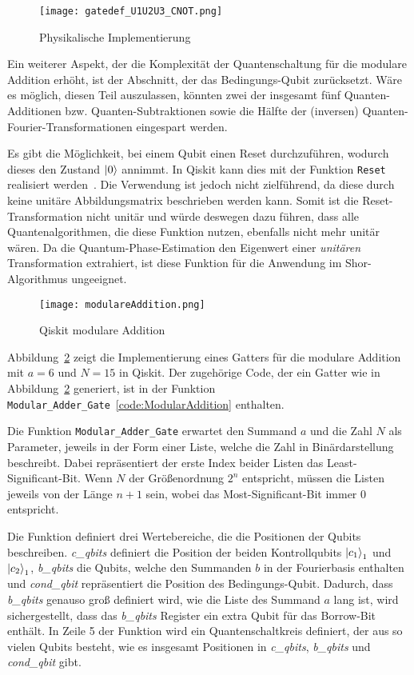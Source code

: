 \begin{figure}[H]
  \centering
  \texttt{[image: gatedef\_U1U2U3\_CNOT.png]}
  \caption{Physikalische Implementierung~\cite{ibmqx5}}
  \label{fig:gatedef_U1U2U3_CNOT}
\end{figure}

Ein weiterer Aspekt, 
der die Komplexität der Quantenschaltung für die modulare Addition erhöht, 
ist der Abschnitt, der das Bedingungs-Qubit zurücksetzt.
Wäre es möglich, diesen Teil auszulassen, könnten zwei der insgesamt fünf Quanten-Additionen bzw. 
Quanten-Subtraktionen sowie die Hälfte der (inversen) Quanten-Fourier-Transformationen eingespart werden.

Es gibt die Möglichkeit, bei einem Qubit einen Reset durchzuführen, wodurch dieses den Zustand \(\ket{0}\) annimmt.
In Qiskit kann dies mit der Funktion \texttt{Reset} realisiert werden~\cite{qiskitReset}.
Die Verwendung ist jedoch nicht zielführend, da diese durch keine unitäre Abbildungsmatrix
beschrieben werden kann.
Somit ist die Reset-Transformation nicht unitär und würde deswegen dazu führen, dass alle Quantenalgorithmen, 
die diese Funktion nutzen, ebenfalls nicht mehr unitär wären.
Da die Quantum-Phase-Estimation den Eigenwert einer \textit{unitären} Transformation extrahiert, 
ist diese Funktion für die Anwendung im Shor-Algorithmus ungeeignet.

\begin{figure}[H]
  \centering
  \texttt{[image: modulareAddition.png]}
  \caption{Qiskit modulare Addition}
  \label{fig:ModularAddition}
\end{figure}

Abbildung~\ref{fig:ModularAddition} zeigt die Implementierung eines Gatters für die modulare Addition 
mit \(a = 6\) und \(N = 15\) in Qiskit.
Der zugehörige Code, der ein Gatter wie in Abbildung~\ref{fig:ModularAddition} generiert, 
ist in der Funktion \texttt{Modular\_Adder\_Gate}~\ref{code:ModularAddition} enthalten.

Die Funktion \texttt{Modular\_Adder\_Gate} erwartet den Summand \(a\) und die Zahl \(N\) als Parameter, 
jeweils in der Form einer Liste, 
welche die Zahl in Binärdarstellung beschreibt.
Dabei repräsentiert der erste Index beider Listen das Least-Significant-Bit.
Wenn \(N\) der Größenordnung \(2^n\) entspricht, 
müssen die Listen jeweils von der Länge \(n+1\) sein, 
wobei das Most-Significant-Bit immer \(0\) entspricht.

Die Funktion definiert drei Wertebereiche, die die Positionen der Qubits beschreiben.
\textit{c\_qbits} definiert die Position der beiden Kontrollqubits \(\ket{c_1}_1\) und \(\ket{c_2}_1\), 
\textit{b\_qbits} die Qubits, welche den Summanden \(b\) 
in der Fourierbasis enthalten 
und \textit{cond\_qbit} repräsentiert die Position des Bedingungs-Qubit.
Dadurch, dass \textit{b\_qbits} genauso groß definiert wird, 
wie die Liste des Summand \(a\) lang ist, wird sichergestellt, 
dass das \textit{b\_qbits} Register ein extra Qubit für das Borrow-Bit enthält.
In Zeile 5 der Funktion wird ein Quantenschaltkreis definiert, 
der aus so vielen Qubits besteht, wie es insgesamt Positionen in 
\textit{c\_qbits}, \textit{b\_qbits} und \textit{cond\_qbit} gibt.

